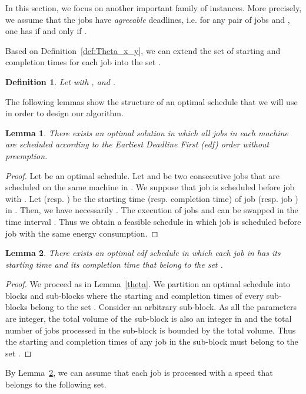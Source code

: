\documentclass[11pt,a4paper]{article}
\newtheorem{lemma}{Lemma}
\newtheorem{definition}{Definition}
\begin{document}
In this section, we focus on another important family of instances. More precisely,
we assume that the jobs have {\em agreeable} deadlines,
i.e.  for any pair of jobs  and , one has  if and only if
.

Based on Definition~\ref{def:Theta_x_y}, we can extend the set of starting and completion times
for each job into the set .
\begin{definition}\label{def:Phi}
Let 
 with , and .
\end{definition}


The following lemmas show the structure of an optimal schedule that we will use in order to design our algorithm.


\begin{lemma}\label{agreeable}
There exists an optimal solution in which all jobs in each machine are
scheduled according to the Earliest Deadline First ({\sc edf}) order without preemption.
\end{lemma}

\begin{proof}
Let  be an optimal schedule.
Let  and  be two consecutive jobs that are scheduled on the same machine  in .
We suppose that job  is scheduled before job  with .
Let  (resp. ) be the starting time (resp. completion time)
of job  (resp. job ) in . Then, we have necessarily . The execution of jobs  and  can be swapped in the time interval 
.
Thus we obtain a feasible schedule  in which job  is scheduled before job
 with the same energy consumption.
\end{proof}



\begin{lemma}\label{Phi}
There exists an optimal {\sc edf} schedule  in which each job in 
has its starting time and its completion time that belong to the set .
\end{lemma}
\begin{proof}
We proceed as in Lemma~\ref{theta}. We partition an optimal schedule
 into blocks and sub-blocks where the starting and completion times of 
every sub-blocks belong to the set . Consider an arbitrary sub-block. As all the 
parameters are integer, the total volume of the sub-block is also an integer in  and the 
total number of jobs processed in the sub-block is bounded by the total volume. 
Thus the starting and completion times of any job in the sub-block must belong to the set . 
\end{proof}

By Lemma~\ref{Phi}, we can assume that each job is processed with a speed that 
belongs to the following set.
\end{document}
